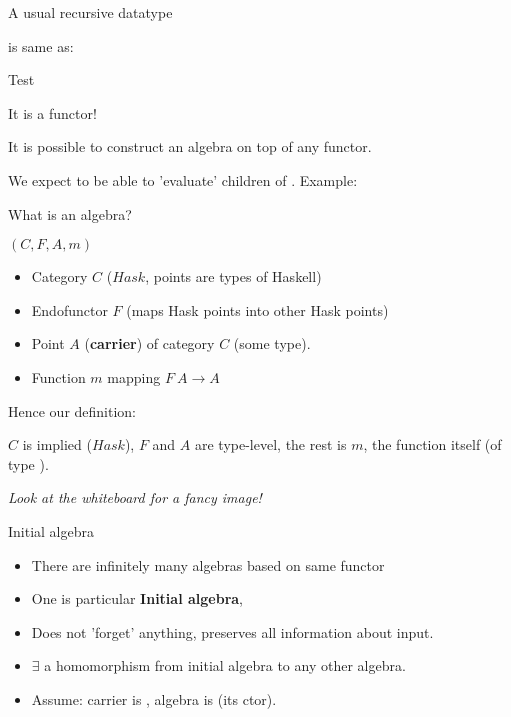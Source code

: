 \documentclass{beamer}
\newcommand{\hin}[2]{}
\begin{document}
\begin{frame}[fragile]{A usual recursive datatype}
\hin{9}{11}

is same as:
\hin{16}{20}
\end{frame}


\begin{frame}[fragile]{Test}
\hin{23}{24}
\end{frame}

 
\begin{frame}[fragile]{It is a functor!}

\hin{29}{32}

It is possible to construct an algebra on top of any functor.

\hin{55}{55}

We expect to be able to 'evaluate' children of .
Example:

\hin{37}{40}

\end{frame}




\begin{frame}[fragile]{What is an algebra?}

$(C, F, A, m)$
\begin{itemize}
\item Category $C$ ($Hask$, points are types of Haskell)
\item Endofunctor $F$ (maps Hask points into other Hask points)
\item Point $A$ (\textbf{carrier}) of category $C$ (some type).
\item Function $m$ mapping $F\ A \rightarrow A$
\end{itemize}
 
Hence our definition:

\hin{55}{55}

$C$ is implied ($Hask$), $F$ and $A$ are type-level, the rest is $m$, the function itself (of type ).

\textit{Look at the whiteboard for a fancy image!}

\end{frame}


\begin{frame}[fragile]{Initial algebra}
\begin{itemize}
\item There are infinitely many algebras based on same functor

\item One is particular \textbf{Initial algebra}, 

\item Does not 'forget' anything, preserves all information about input.

\item $\exists$ a homomorphism from initial algebra to any other algebra.

\item Assume: carrier is , algebra is  (its ctor).

\hin{55}{55}
\hin{63}{65}

\end{itemize}

\end{frame}
\end{document}
